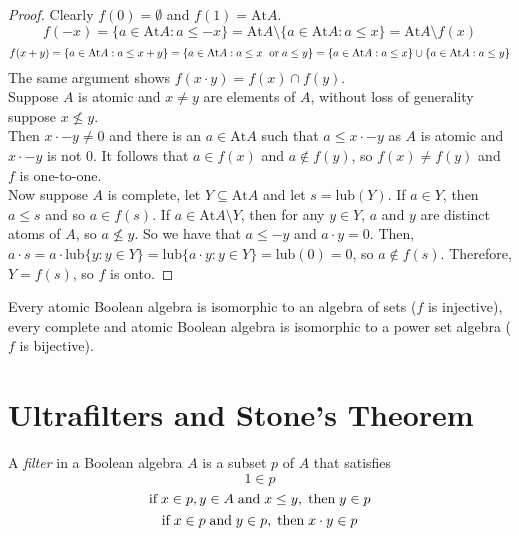 \documentclass[12pt]{article}
\begin{document}
\begin{proof}
Clearly $f(0)=\emptyset$ and $f(1)=\text{At}A$.
\[
f(-x)=\{a\in \text{At}A:a\le -x\}=\text{At}A\setminus\{a\in \text{At}A:a\le x\}=\text{At}A\setminus f(x)
\]
\[
f(x+y)=\{a\in\text{At}A:a\le x+y\}=\{a\in\text{At}A:a\le x \text{\; or\;} a\le y\} =\{a\in\text{At}A:a\le x\}\cup\{a\in\text{At}A:a\le y\}
\]
The same argument shows $f(x\cdot y)=f(x)\cap f(y)$.\\
Suppose $A$ is atomic and $x\neq y$ are elements of $A$, without loss of generality suppose $x\not\le y$.
\\Then $x\cdot -y\neq 0$ and there is an $a\in \text{At}A$ such that $a\le x\cdot -y$ as $A$ is atomic and $x\cdot -y$ is not 0.
It follows that $a\in f(x)$ and $a\not\in f(y)$, so $f(x)\neq f(y)$ and $f$ is one-to-one.\\
Now suppose $A$ is complete, let $Y\subseteq \text{At}A$ and let $s=\text{lub}(Y)$.
If $a\in Y$, then $a\le s$ and so $a\in f(s)$. 
If $a\in \text{At}A\setminus Y$, then for any $y\in Y$, $a$ and $y$ are distinct atoms of $A$, so $a\not\le y$.
So we have that $a\le -y$ and $a\cdot y=0$.
Then, $a\cdot s=a\cdot \text{lub}\{y:y\in Y\}=\text{lub}\{a\cdot y:y\in Y\}=\text{lub}(0)=0$, so $a\not\in f(s)$.
Therefore, $Y=f(s)$, so $f$ is onto.
\end{proof}

\begin{corollary}
Every atomic Boolean algebra is isomorphic to an algebra of sets ($f$ is injective), every complete and atomic Boolean algebra is isomorphic to a power set algebra ($f$ is bijective).
\end{corollary}

\section{Ultrafilters and Stone's Theorem}

\begin{definition}
A \textit{filter} in a Boolean algebra $A$ is a subset $p$ of $A$ that satisfies 
\begin{equation*}
    1\in p
\end{equation*}
\begin{equation*}
    \text{if\;} x\in p, y\in A \text{\;and\;} x\le y, \text{\;then\;} y\in p
\end{equation*}
\begin{equation*}
    \text{if\;} x\in p\text{\;and\;}y\in p, \text{\;then\;} x\cdot y\in p
\end{equation*}
\end{definition}
\end{document}
